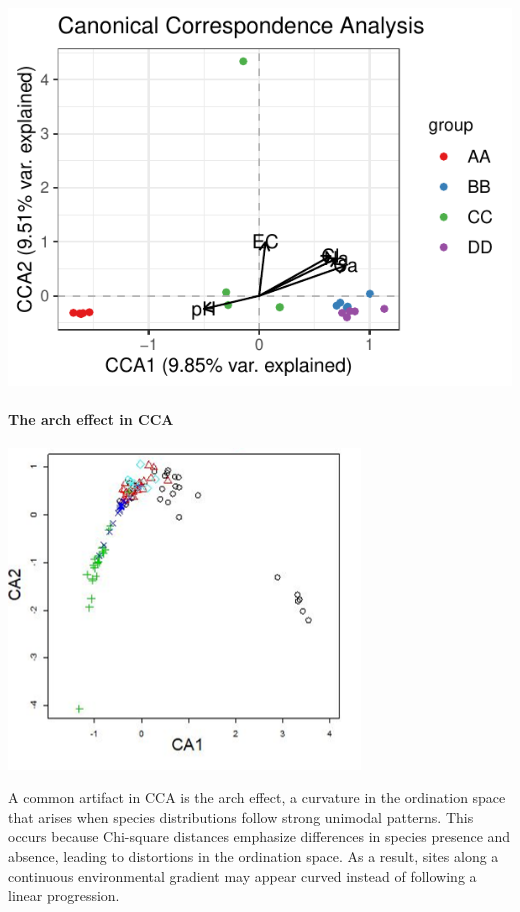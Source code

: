 \documentclass[
]{article}
\begin{document}
\includegraphics{workshop_files/figure-latex/unnamed-chunk-30-1.pdf}

\hypertarget{the-arch-effect-in-cca}{%
\paragraph{The arch effect in CCA}\label{the-arch-effect-in-cca}}

\includegraphics[width=0.7\textwidth,height=\textheight]{images/Fig11.png}

A common artifact in CCA is the arch effect, a curvature in the
ordination space that arises when species distributions follow strong
unimodal patterns. This occurs because Chi-square distances emphasize
differences in species presence and absence, leading to distortions in
the ordination space. As a result, sites along a continuous
environmental gradient may appear curved instead of following a linear
progression.
\end{document}
